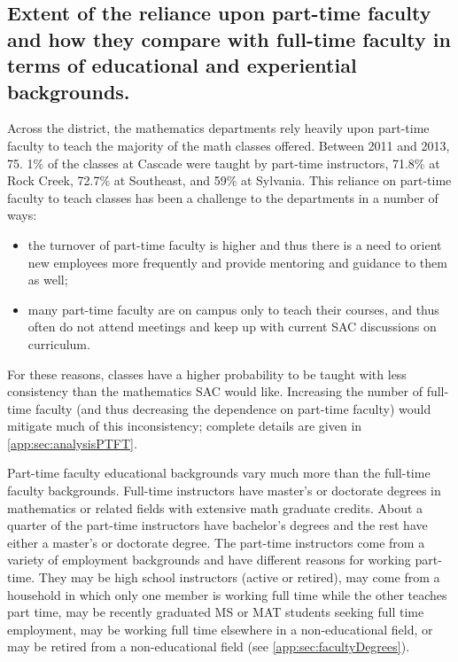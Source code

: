\subsection[Part-time faculty]{Extent of the reliance upon part-time faculty and how they compare
	with full-time faculty in terms of educational and experiential backgrounds.}
Across the district, the mathematics departments rely heavily upon part-time faculty to teach the majority of the math classes offered.
Between 2011 and 2013, 75.
1\% of the classes at Cascade were taught by part-time instructors,
71.8\% at Rock Creek, 72.7\% at Southeast, and 59\% at Sylvania.
This reliance on part-time faculty to teach classes has been a challenge to the departments in a number of ways: \begin{itemize} \item the turnover of part-time faculty is higher and thus there is a need to orient new employees more frequently and provide mentoring and guidance to them as well; \item many part-time faculty are on campus only to teach their courses, and thus often do not attend meetings and keep up with current SAC discussions on curriculum.
\end{itemize}
For these reasons, classes have a higher probability to be taught with less consistency than the mathematics SAC would like.
Increasing the number of full-time faculty (and thus decreasing the dependence on part-time faculty) would mitigate much of this inconsistency; complete details are given in  \vref{app:sec:analysisPTFT}.

Part-time faculty educational backgrounds vary much more than the full-time faculty backgrounds.
Full-time instructors have master's or doctorate degrees in mathematics or related fields with extensive math graduate credits.
About a quarter of the part-time instructors have bachelor's degrees and the rest have either a master's or doctorate degree.
The part-time instructors come from a variety of employment backgrounds and have different reasons for working part-time.
They may be high school instructors (active or retired), may come from a household in which only one member is working full time while the other teaches part time, may be recently graduated MS or MAT students seeking full time employment, may be working full time elsewhere in a non-educational field, or may be retired from a non-educational field (see \vref{app:sec:facultyDegrees}).

